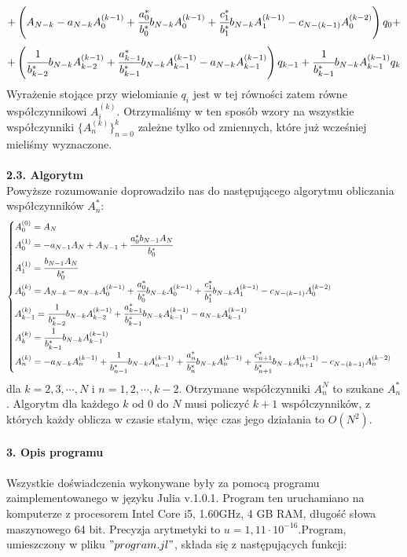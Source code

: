 \documentclass[a4paper]{article}
\begin{document}
$$+ \left(A_{N-k} - a_{N-k}A_0^{(k-1)} + \cfrac{a_0^*}{b_0^*}b_{N-k}A_0^{(k-1)} + \cfrac{c_1^*}{b_1^*}b_{N-k}A_1^{(k-1)} - c_{N-(k-1)}A_0^{(k-2)}\right)q_0 +$$
$$+ \left(\cfrac{1}{b_{k-2}^*}b_{N-k}A_{k-2}^{(k-1)} + \cfrac{a_{k-1}^*}{b_{k-1}^*}b_{N-k}A_{k-1}^{(k-1)} - a_{N-k}A_{k-1}^{(k-1)}\right)q_{k-1} + \cfrac{1}{b_{k-1}^*}b_{N-k}A_{k-1}^{(k-1)}q_k$$
Wyrażenie stojące przy wielomianie $q_i$ jest w tej równości zatem równe współczynnikowi $A_i^{(k)}$. Otrzymaliśmy w ten sposób wzory na wszystkie współczynniki $\{A_n^{(k)}\}_{n=0}^{k}$ zależne tylko od zmiennych, które już wcześniej mieliśmy wyznaczone.\\\\

\large
\textbf{2.3. Algorytm}\\
\normalsize
Powyższe rozumowanie doprowadziło nas do następującego algorytmu obliczania współczynników $A_n^*$:
\large
\begin{equation}\label{algorithm}
\begin{cases}
A_0^{(0)} = A_N\\
A_0^{(1)} = -a_{N-1}A_N + A_{N-1} + \cfrac{a_0^*b_{N-1}A_N}{b_0^*}\\
A_1^{(1)} = \cfrac{b_{N-1}A_N}{b_0^*}\\
A_0^{(k)} = A_{N-k} - a_{N-k}A_0^{(k-1)} + \cfrac{a_0^*}{b_0^*}b_{N-k}A_0^{(k-1)} + \cfrac{c_1^*}{b_1^*}b_{N-k}A_1^{(k-1)} - c_{N-(k-1)}A_0^{(k-2)}\\
A_{k-1}^{(k)} = \cfrac{1}{b_{k-2}^*}b_{N-k}A_{k-2}^{(k-1)} + \cfrac{a_{k-1}^*}{b_{k-1}^*}b_{N-k}A_{k-1}^{(k-1)} - a_{N-k}A_{k-1}^{(k-1)}\\
A_k^{(k)} = \cfrac{1}{b_{k-1}^*}b_{N-k}A_{k-1}^{(k-1)}\\
A_n^{(k)} = -a_{N-k}A_n^{(k-1)} + \cfrac{1}{b_{n-1}^*}b_{N-k}A_{n-1}^{(k-1)} + \cfrac{a_n^*}{b_n^*}b_{N-k}A_n^{(k-1)} + \cfrac{c_{n+1}^*}{b_{n+1}^*}b_{N-k}A_{n+1}^{(k-1)} - c_{N-(k-1)}A_n^{(k-2)}
\end{cases}
\end{equation}
\normalsize
dla $k=2,3,\cdots,N$ i $n=1,2,\cdots,k-2$. Otrzymane współczynniki $A_n^N$ to szukane $A_n^*$. Algorytm dla każdego $k$ od $0$ do $N$ musi policzyć $k+1$ współczynników, z których każdy oblicza w czasie stałym, więc czas jego działania to $O(N^2)$.\\\\

\Large
\textbf{3. Opis programu}\\\\
\normalsize
Wszystkie doświadczenia wykonywane były za pomocą programu zaimplementowanego w języku Julia v.1.0.1. Program ten uruchamiano na komputerze z procesorem Intel Core i5, 1.60GHz, 4 GB RAM, długość słowa maszynowego 64 bit. Precyzja arytmetyki to $u = 1,11 \cdot 10^{-16}$.Program, umieszczony w pliku $"program.jl"$, składa się z następujących funkcji:
\end{document}
